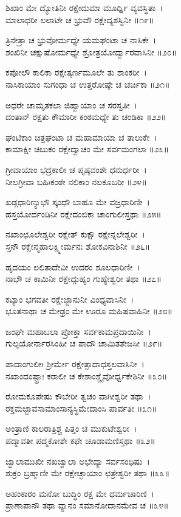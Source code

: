 ಶಿಖಾಂ ಮೇ ದ್ಯೋತಿನೀ ರಕ್ಷೇದುಮಾ ಮೂರ್ಧ್ನಿ ವ್ಯವಸ್ಥಿತಾ~।\\
ಮಾಲಾಧರೀ ಲಲಾಟೇ ಚ ಭ್ರುವೌ ರಕ್ಷೇದ್ಯಶಸ್ವಿನೀ ॥೧೯॥

ತ್ರಿನೇತ್ರಾ ಚ ಭ್ರುವೋರ್ಮಧ್ಯೇ ಯಮಘಂಟಾ ಚ ನಾಸಿಕೇ~।\\
ಶಂಖಿನೀ ಚಕ್ಷುಷೋರ್ಮಧ್ಯೇ ಶ್ರೋತ್ರಯೋರ್ದ್ವಾರವಾಸಿನೀ ॥೨೦॥

ಕಪೋಲೌ ಕಾಲಿಕಾ ರಕ್ಷೇತ್ಕರ್ಣಮೂಲೇ ತು ಶಾಂಕರೀ~।\\
ನಾಸಿಕಾಯಾಂ ಸುಗಂಧಾ ಚ ಉತ್ತರೋಷ್ಠೇ ಚ ಚರ್ಚಿಕಾ ॥೨೧॥

ಅಧರೇ ಚಾಮೃತಕಲಾ ಜಿಹ್ವಾಯಾಂ ಚ ಸರಸ್ವತೀ~।\\
ದಂತಾನ್ ರಕ್ಷತು ಕೌಮಾರೀ ಕಂಠಮಧ್ಯೇ ತು ಚಂಡಿಕಾ ॥೨೨॥

ಘಂಟಿಕಾಂ ಚಿತ್ರಘಂಟಾ ಚ ಮಹಾಮಾಯಾ ಚ ತಾಲುಕೇ~।\\
ಕಾಮಾಕ್ಷೀ ಚಿಬುಕಂ ರಕ್ಷೇದ್ವಾಚಂ ಮೇ ಸರ್ವಮಂಗಲಾ ॥೨೩॥

ಗ್ರೀವಾಯಾಂ ಭದ್ರಕಾಲೀ ಚ ಪೃಷ್ಠವಂಶೇ ಧನುರ್ಧರೀ~।\\
ನೀಲಗ್ರೀವಾ ಬಹಿಃಕಂಠೇ ನಲಿಕಾಂ ನಲಕೂಬರೀ ॥೨೪॥

ಖಡ್ಗಧಾರಿಣ್ಯುಭೌ ಸ್ಕಂಧೌ ಬಾಹೂ ಮೇ ವಜ್ರಧಾರಿಣೀ~।\\
ಹಸ್ತಯೋರ್ದಂಡಿನೀ ರಕ್ಷೇದಂಬಿಕಾ ಚಾಂಗುಲೀಸ್ತಥಾ ॥೨೫॥

ನಖಾಂಛೂಲೇಶ್ವರೀ ರಕ್ಷೇತ್ ಕುಕ್ಷೌ ರಕ್ಷೇನ್ನಲೇಶ್ವರೀ~।\\
ಸ್ತನೌ ರಕ್ಷೇನ್ಮಹಾಲಕ್ಷ್ಮೀರ್ಮನಃ ಶೋಕವಿನಾಶಿನೀ ॥೨೬॥

ಹೃದಯಂ ಲಲಿತಾದೇವೀ ಉದರಂ ಶೂಲಧಾರಿಣೀ~।\\
ನಾಭೌ ಚ ಕಾಮಿನೀ ರಕ್ಷೇದ್ಗುಹ್ಯಂ ಗುಹ್ಯೇಶ್ವರೀ ತಥಾ ॥೨೭॥

ಕಟ್ಯಾಂ ಭಗವತೀ ರಕ್ಷೇಜ್ಜಾನುನೀ ವಿಂಧ್ಯವಾಸಿನೀ~।\\
ಭೂತನಾಥಾ ಚ ಮೇಢ್ರಂ ಮೇ ಊರೂ ಮಹಿಷವಾಹಿನೀ ॥೨೮॥

ಜಂಘೇ ಮಹಾಬಲಾ ಪ್ರೋಕ್ತಾ ಸರ್ವಕಾಮಪ್ರದಾಯಿನೀ~।\\
ಗುಲ್ಫಯೋರ್ನಾರಸಿಂಹೀ ಚ ಪಾದೌ ಚಾಮಿತತೇಜಸೀ ॥೨೯॥

ಪಾದಾಂಗುಲೀಃ ಶ್ರೀರ್ಮೇ ರಕ್ಷೇತ್ಪಾದಾಧಸ್ತಲವಾಸಿನೀ~।\\
ನಖಾಂದಂಷ್ಟ್ರಾಃ ಕರಾಲೀ ಚ ಕೇಶಾಂಶ್ಚೈವೋರ್ಧ್ವಕೇಶಿನೀ ॥೩೦॥

ರೋಮಕೂಪೇಷು ಕೌಬೇರೀ ತ್ವಚಂ ವಾಗೀಶ್ವರೀ ತಥಾ~।\\
ರಕ್ತಮಜ್ಜಾವಸಾಮಾಂಸಾನ್ಯಸ್ಥಿಮೇದಾಂಸಿ ಪಾರ್ವತೀ ॥೩೧॥

ಅಂತ್ರಾಣಿ ಕಾಲರಾತ್ರಿಶ್ಚ ಪಿತ್ತಂ ಚ ಮುಕುಟೇಶ್ವರೀ~।\\
ಪದ್ಮಾವತೀ ಪದ್ಮಕೋಶೇ ಕಫೇ ಚೂಡಾಮಣಿಸ್ತಥಾ ॥೩೨॥

ಜ್ವಾಲಾಮುಖೀ ನಖಜ್ವಾಲಾ ಅಭೇದ್ಯಾ ಸರ್ವಸಂಧಿಷು~।\\
ಶುಕ್ರಂ ಬ್ರಹ್ಮಾಣೀ ಮೇ ರಕ್ಷೇಚ್ಛಾಯಾಂ ಛತ್ರೇಶ್ವರೀ ತಥಾ ॥೩೩॥

ಅಹಂಕಾರಂ ಮನೋ ಬುದ್ಧಿಂ ರಕ್ಷ ಮೇ ಧರ್ಮಚಾರಿಣಿ~।\\
ಪ್ರಾಣಾಪಾನೌ ತಥಾ ವ್ಯಾನಂ ಸಮಾನೋದಾನಮೇವ ಚ ॥೩೪॥

